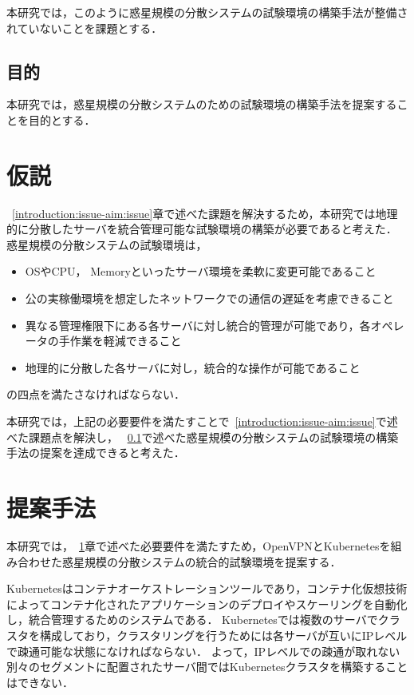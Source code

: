 本研究では，このように惑星規模の分散システムの試験環境の構築手法が整備されていないことを課題とする．

\subsection{目的}
\label{introduction:issue-aim:aim}

本研究では，惑星規模の分散システムのための試験環境の構築手法を提案することを目的とする．

\section{仮説}
\label{introduction:hypothesis}

~\ref{introduction:issue-aim:issue}章で述べた課題を解決するため，本研究では地理的に分散したサーバを統合管理可能な試験環境の構築が必要であると考えた．
惑星規模の分散システムの試験環境は，
\begin{itemize}
  \item OSやCPU， Memoryといったサーバ環境を柔軟に変更可能であること
  \item 公の実稼働環境を想定したネットワークでの通信の遅延を考慮できること
  \item 異なる管理権限下にある各サーバに対し統合的管理が可能であり，各オペレータの手作業を軽減できること
  \item 地理的に分散した各サーバに対し，統合的な操作が可能であること
\end{itemize}
の四点を満たさなければならない．

本研究では，上記の必要要件を満たすことで~\ref{introduction:issue-aim:issue}で述べた課題点を解決し，
~\ref{introduction:issue-aim:aim}で述べた惑星規模の分散システムの試験環境の構築手法の提案を達成できると考えた．

\section{提案手法}
\label{introduction:proposal}

本研究では，~\ref{introduction:hypothesis}章で述べた必要要件を満たすため，OpenVPNとKubernetesを組み合わせた惑星規模の分散システムの統合的試験環境を提案する．

Kubernetesはコンテナオーケストレーションツールであり，コンテナ化仮想技術によってコンテナ化されたアプリケーションのデプロイやスケーリングを自動化し，統合管理するためのシステムである．
Kubernetesでは複数のサーバでクラスタを構成しており，クラスタリングを行うためには各サーバが互いにIPレベルで疎通可能な状態になければならない．
よって，IPレベルでの疎通が取れない別々のセグメントに配置されたサーバ間ではKubernetesクラスタを構築することはできない．

